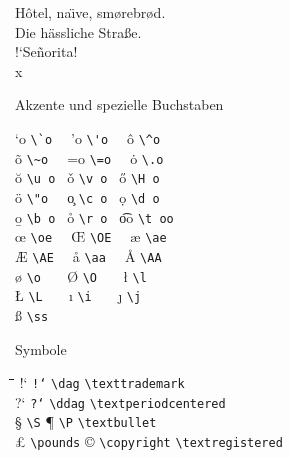 \begin{LTXexample}
H\^otel, na\"\i ve, sm\o rebr\o d. \\
Die h\"assliche Stra\ss{}e.\\
!`Se\~norita!\\
\textcircled{x}
\end{LTXexample}


\begin{table}[tbp]
\caption{Akzente und spezielle Buchstaben} \label{akzente}
\begin{symbols}
\a`o  \>   \lstinline|\`o  | \> \a'o  \> \lstinline|\'o  | \> \^o   \>   \lstinline|\^o  | \\
\~o   \>   \lstinline|\~o  | \> \a=o  \> \lstinline|\=o  | \> \.o   \>   \lstinline|\.o  | \\
\u o  \>   \lstinline|\u o | \> \v o  \> \lstinline|\v o | \> \H o  \>   \lstinline|\H o | \\
\"o   \>   \lstinline|\"o  | \> \c o  \> \lstinline|\c o | \> \d o  \>   \lstinline|\d o | \\
\b o  \>   \lstinline|\b o | \> \r o  \> \lstinline|\r o | \> \t oo \>   \lstinline|\t oo| \\[6pt]
\oe   \>   \lstinline|\oe  | \> \OE   \> \lstinline|\OE  | \> \ae   \>   \lstinline|\ae  | \\
\AE   \>   \lstinline|\AE  | \> \aa   \> \lstinline|\aa  | \> \AA   \>   \lstinline|\AA  | \\
\o    \>   \lstinline|\o   | \> \O    \> \lstinline|\O   | \> \l    \>   \lstinline|\l   | \\
\L    \>   \lstinline|\L   | \> \i    \> \lstinline|\i   | \> \j    \>   \lstinline|\j   | \\
\ss   \>   \lstinline|\ss  | \\
\end{symbols}
\end{table}
 
\begin{table}[tbp]
  \caption{Symbole} \label{specials}
   \begin{tabbing}
   \hspace{1cm}\=\hspace{3.15cm}\=  \hspace{1cm}\=\hspace{3.15cm}\=
   \hspace{1cm}\=\hspace{3.5cm}\=  \kill
!` \> \texttt{!{}`}      \> \dag \> \lstinline|\dag|            \> \texttrademark  \> \lstinline|\texttrademark|   \\         
?` \> \texttt{?{}`}      \> \ddag \> \lstinline|\ddag|          \> \textperiodcentered \> \lstinline|\textperiodcentered| \\ 
\S \> \lstinline|\S|          \> \P \> \lstinline|\P|                \> \textbullet    \> \lstinline|\textbullet| \\              
\pounds\> \lstinline|\pounds| \> \copyright \> \lstinline|\copyright|\>\textregistered  \> \lstinline|\textregistered| \\ 
   \end{tabbing}
\end{table}


